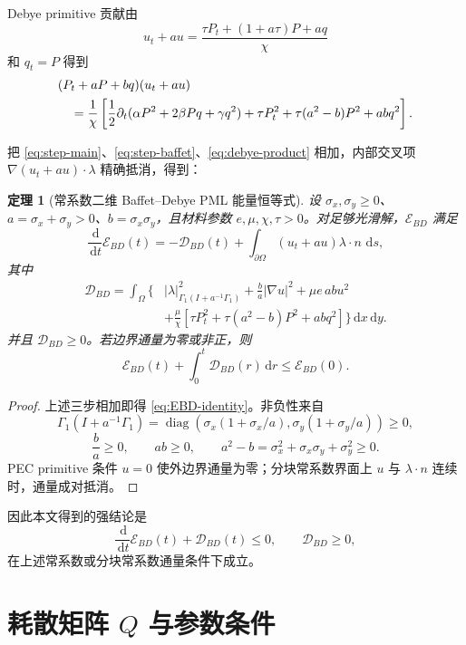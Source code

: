 \documentclass[UTF8,a4paper,11pt]{ctexart}
\newtheorem{theorem}{定理}
\newcommand{\dd}{\,\mathrm d}
\newcommand{\sx}{\sigma_x}
\newcommand{\sy}{\sigma_y}
\newcommand{\Ecal}{\mathcal E}
\newcommand{\Dcal}{\mathcal D}
\newcommand{\diag}{\operatorname{diag}}
\begin{document}
Debye primitive 贡献由
\[
u_t+a u=\frac{\tau P_t+(1+a\tau)P+a q}{\chi}
\]
和 \(q_t=P\) 得到
\begin{align}
&(P_t+aP+bq)(u_t+a u) \notag\\
&\quad
=\frac1\chi\left[
\frac12\partial_t(\alpha P^2+2\beta Pq+\gamma q^2)
+\tau P_t^2+\tau(a^2-b)P^2+abq^2
\right].
\label{eq:debye-product}
\end{align}

把 \eqref{eq:step-main}、\eqref{eq:step-baffet}、\eqref{eq:debye-product}
相加，内部交叉项 \(\nabla(u_t+a u)\cdot\lambda\) 精确抵消，得到：

\begin{theorem}[常系数二维 Baffet--Debye PML 能量恒等式]
设 \(\sx,\sy\ge0\)、\(a=\sx+\sy>0\)、\(b=\sx\sy\)，且材料参数
\(e,\mu,\chi,\tau>0\)。对足够光滑解，\(\Ecal_{BD}\) 满足
\begin{equation}
\boxed{
\frac{\dd}{\dd t}\Ecal_{BD}(t)
=-\Dcal_{BD}(t)
+\int_{\partial\Omega}(u_t+a u)\lambda\cdot n\,\dd s,}
\label{eq:EBD-identity}
\end{equation}
其中
\begin{equation}
\boxed{
\begin{aligned}
\Dcal_{BD}
=\int_\Omega \{&
|\lambda|^2_{\Gamma_1(I+a^{-1}\Gamma_1)}
+\frac{b}{a}|\nabla u|^2+\mu e\,ab u^2\\
&+\frac{\mu}{\chi}\left[
\tau P_t^2+\tau(a^2-b)P^2+abq^2
\right]\}\dd x\dd y .
\end{aligned}}
\label{eq:DBD}
\end{equation}
并且 \(\Dcal_{BD}\ge0\)。若边界通量为零或非正，则
\[
\Ecal_{BD}(t)+\int_0^t\Dcal_{BD}(r)\dd r\le \Ecal_{BD}(0).
\]
\end{theorem}

\begin{proof}
上述三步相加即得 \eqref{eq:EBD-identity}。非负性来自
\[
\Gamma_1(I+a^{-1}\Gamma_1)
=\diag\!\left(\sx(1+\sx/a),\sy(1+\sy/a)\right)\ge0,
\]
\[
\frac{b}{a}\ge0,\qquad ab\ge0,\qquad
a^2-b=\sx^2+\sx\sy+\sy^2\ge0.
\]
PEC primitive 条件 \(u=0\) 使外边界通量为零；分块常系数界面上 \(u\) 与
\(\lambda\cdot n\) 连续时，通量成对抵消。
\end{proof}

因此本文得到的强结论是
\[
\frac{\dd}{\dd t}\Ecal_{BD}(t)+\Dcal_{BD}(t)\le0,\qquad \Dcal_{BD}\ge0,
\]
在上述常系数或分块常系数通量条件下成立。

\section{耗散矩阵 \texorpdfstring{\(Q\)}{Q} 与参数条件}
\end{document}
